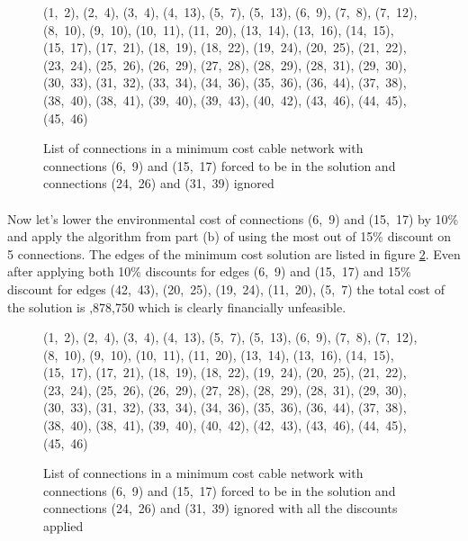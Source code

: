 \begin{enumerate}[(a)]
\begin{figure}[H]
	\centering
	\begin{multicols}{5}
(1,~2), (2,~4), (3,~4), (4,~13), (5,~7), (5,~13), (6,~9), (7,~8), (7,~12), (8,~10), (9,~10), (10,~11), (11,~20), (13,~14), (13,~16), (14,~15), (15,~17), (17,~21), (18,~19), (18,~22), (19,~24), (20,~25), (21,~22), (23,~24), (25,~26), (26,~29), (27,~28), (28,~29), (28,~31), (29,~30), (30,~33), (31,~32), (33,~34), (34,~36), (35,~36), (36,~44), (37,~38), (38,~40), (38,~41), (39,~40), (39,~43), (40,~42), (43,~46), (44,~45), (45,~46)
	\end{multicols}
	\caption{List of connections in a minimum cost cable network with connections (6,~9) and (15,~17) forced to be in the solution and connections (24,~26) and (31,~39) ignored}
	\label{mst2-2-d-1}
\end{figure}

	\paragraph{}
	Now let's lower the environmental cost of connections (6,~9) and (15,~17) by 10\% and apply the algorithm from part (b) of using the most out of 15\% discount on 5 connections. The edges of the minimum cost solution are listed in figure \ref{mst2-2-d-2}. Even after applying both 10\% discounts for edges (6,~9) and (15,~17) and 15\% discount for edges (42,~43), (20,~25), (19,~24), (11,~20), (5,~7) the total cost of the solution is ,878,750 which is clearly financially unfeasible.

\begin{figure}[H]
	\centering
	\begin{multicols}{5}
(1,~2), (2,~4), (3,~4), (4,~13), (5,~7), (5,~13), (6,~9), (7,~8), (7,~12), (8,~10), (9,~10), (10,~11), (11,~20), (13,~14), (13,~16), (14,~15), (15,~17), (17,~21), (18,~19), (18,~22), (19,~24), (20,~25), (21,~22), (23,~24), (25,~26), (26,~29), (27,~28), (28,~29), (28,~31), (29,~30), (30,~33), (31,~32), (33,~34), (34,~36), (35,~36), (36,~44), (37,~38), (38,~40), (38,~41), (39,~40), (40,~42), (42,~43), (43,~46), (44,~45), (45,~46)
	\end{multicols}
	\caption{List of connections in a minimum cost cable network with connections (6,~9) and (15,~17) forced to be in the solution and connections (24,~26) and (31,~39) ignored with all the discounts applied}
	\label{mst2-2-d-2}
\end{figure}

\end{enumerate}


